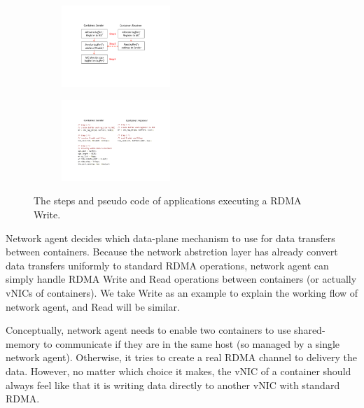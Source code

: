      \begin{figure}[t!]
     \centering 
     \begin{subfigure}
     \centering 
     \includegraphics[width=0.45\textwidth]{figures/system/sys_rdma_steps.pdf}
     \end{subfigure}
           
     \begin{subfigure}
     \centering 
     \includegraphics[width=0.45\textwidth]{figures/system/sys_rdma_code.pdf}      
     \end{subfigure}
     \label{fig:sys_rdma_steps_code}
     \caption{The steps and pseudo code of applications executing a RDMA Write.} 
     \end{figure}

Network agent decides which data-plane mechanism to use for data transfers
between containers. Because the network abstrction layer has already convert
data transfers uniformly to standard RDMA operations, network agent can simply
handle RDMA Write and Read operations between containers (or actually vNICs
of containers). We take Write as an example to explain the working flow of
network agent, and Read will be similar.

Conceptually, network agent needs to enable two containers to use shared-memory
to communicate if they are in the same host (so managed by a single network
agent). Otherwise, it tries to create a real RDMA channel to delivery the data.
However, no matter which choice it makes, the vNIC of a container should always
feel like that it is writing data directly to another vNIC with standard RDMA.


